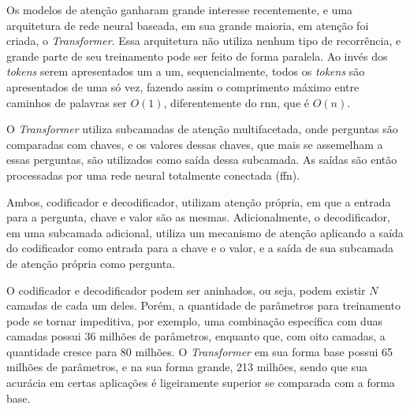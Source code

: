 Os modelos de atenção ganharam grande interesse recentemente, e uma arquitetura de rede neural baseada, em sua grande maioria, em atenção foi criada, o \textit{Transformer}. Essa arquitetura não utiliza nenhum tipo de recorrência, e grande parte de seu treinamento pode ser feito de forma paralela. Ao invés dos \textit{tokens} serem apresentados um a um, sequencialmente, todos os \textit{tokens} são apresentados de uma só vez, fazendo assim o comprimento máximo entre caminhos de palavras ser $O(1)$, diferentemente do \gls{rnn}, que é $O(n)$.

O \textit{Transformer} utiliza subcamadas de atenção multifacetada, onde perguntas são comparadas com chaves, e os valores dessas chaves, que mais se assemelham a essas perguntas, são utilizados como saída dessa subcamada. As saídas são então processadas por uma rede neural totalmente conectada (\gls{ffn}).

Ambos, codificador e decodificador, utilizam atenção própria, em que a entrada para a pergunta, chave e valor são as mesmas. Adicionalmente, o decodificador, em uma subcamada adicional, utiliza um mecanismo de atenção aplicando a saída do codificador como entrada para a chave e o valor, e a saída de sua subcamada de atenção própria como pergunta.

O codificador e decodificador podem ser aninhados, ou seja, podem existir $N$ camadas de cada um deles. Porém, a quantidade de parâmetros para treinamento pode se tornar impeditiva, por exemplo, uma combinação específica com duas camadas possui 36 milhões de parâmetros, enquanto que, com oito camadas, a quantidade cresce para 80 milhões. O \textit{Transformer} em sua forma base possui 65 milhões de parâmetros, e na sua forma grande, 213 milhões, sendo que sua acurácia em certas aplicações é ligeiramente superior se comparada com a forma base.

